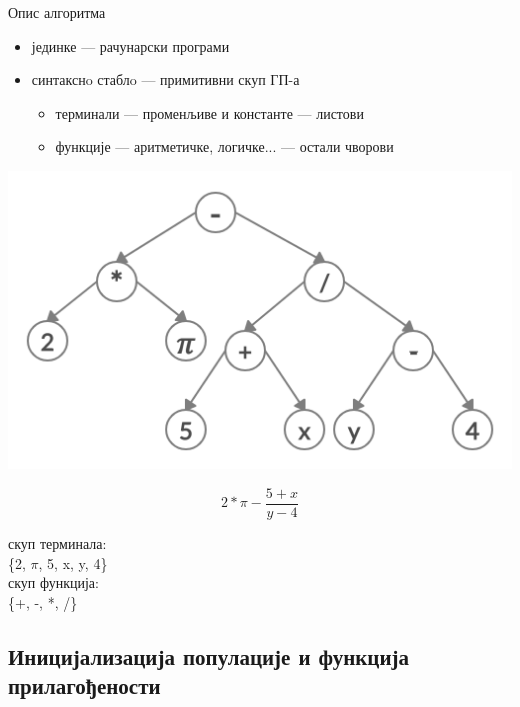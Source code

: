 \documentclass{beamer}
\begin{document}
\begin{frame}{Опис алгоритма}
    \begin{itemize}
        \item јединке — рачунарски програми
        \item синтакснo стаблo — примитивни скуп ГП-а
        \begin{itemize}
            \item терминали — променљиве и константе — листови
            \item функције — аритметичке, логичке... — остали чворови
        \end{itemize}
    \end{itemize}
    \begin{minipage}{0.6\textwidth}
        \includegraphics[scale=0.18]{sintaksno_stablo.png}
    \end{minipage}
    \begin{minipage}{0.35\textwidth}\raggedleft
        \begin{equation*} 
            2*\pi-\frac{5+x}{y-4}
        \end{equation*}
        \begin{center}
        скуп терминала:\\
        \{2, $\pi$, 5, x, y, 4\}\\
        скуп функција:\\
        \{+, -, *, /\}
        \end{center}
    \end{minipage}
\end{frame}
    
\subsection[Иницијализација популације и функција прилагођености]{Иницијализација популације и функција прилагођености}
\end{document}

